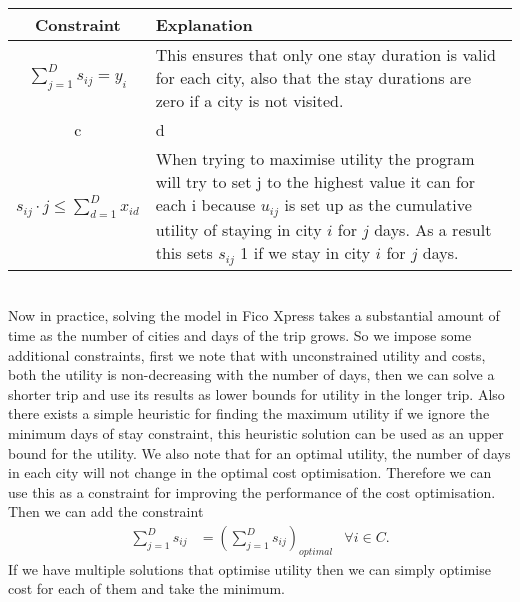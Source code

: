 \documentclass[12pt]{article}
\begin{document}
\begin{tabular}{c|p{11cm}}
\hline
Constraint &  Explanation \\
\hline
$\sum_{j=1}^{D} s_{ij} = y_{i}$ & This ensures that only one stay duration is valid for each city, also that the stay durations are zero if a city is not visited. \\
c & d \\
\hline
$s_{ij} \cdot j \leq \sum_{d=1}^{D} x_{id}$ & When trying to maximise utility the program will try to set j to the highest value it can for each i because $u_{ij}$ is set up as the cumulative utility of staying in city $i$ for $j$ days. As a result this sets $s_{ij}$ 1 if we stay in city $i$ for $j$ days. \\
\end{tabular}
\vspace{5mm}\\

Now in practice, solving the model in Fico Xpress takes a substantial amount of time as the number of cities and days of the trip grows. So we impose some additional constraints, first we note that with unconstrained utility and costs, both the utility is non-decreasing with the number of days, then we can solve a shorter trip and use its results as lower bounds for utility in the longer trip. Also there exists a simple heuristic for finding the maximum utility if we ignore the minimum days of stay constraint, this heuristic solution can be used as an upper bound for the utility. We also note that for an optimal utility, the number of days in each city will not change in the optimal cost optimisation. Therefore we can use this as a constraint for improving the performance of the cost optimisation. Then we can add the constraint
\begin{align*}
	\sum\limits_{j=1}^D s_{ij} &= (\sum\limits_{j=1}^D s_{ij})_{optimal} & \forall i \in C.
\end{align*}
If we have multiple solutions that optimise utility then we can simply optimise cost for each of them and take the minimum.
\pagebreak
\end{document}
